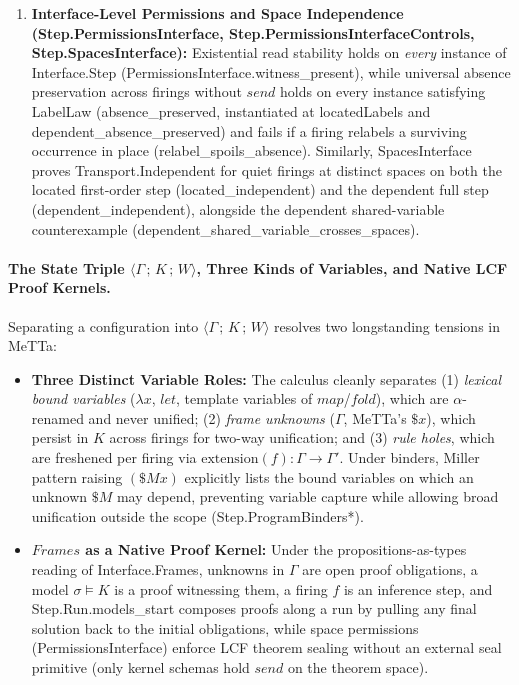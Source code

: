 \documentclass[11pt,a4paper]{article}
\theoremstyle{definition}
\DeclareRobustCommand{\lean}[1]{%
  \ifmmode\text{\normalfont\ttfamily\footnotesize\detokenize{#1}}%
  \else{\normalfont\footnotesize\leanurl{#1}}\fi}
\DeclareRobustCommand{\metta}[1]{\text{\normalfont\ttfamily\footnotesize #1}}
\def\lean#1{#1}%
\def\metta#1{#1}%
\begin{document}
\begin{enumerate}[leftmargin=2em, nosep]
  \item \textbf{Interface-Level Permissions and Space Independence (\lean{Step.PermissionsInterface}, \lean{Step.PermissionsInterfaceControls}, \lean{Step.SpacesInterface}):}
  Existential read stability holds on \emph{every} instance of \lean{Interface.Step} (\lean{PermissionsInterface.witness_present}), while universal absence preservation across firings without $\lean{send}$ holds on every instance satisfying \lean{LabelLaw} (\lean{absence_preserved}, instantiated at \lean{locatedLabels} and \lean{dependent_absence_preserved}) and fails if a firing relabels a surviving occurrence in place (\lean{relabel_spoils_absence}). Similarly, \lean{SpacesInterface} proves \lean{Transport.Independent} for quiet firings at distinct spaces on both the located first-order step (\lean{located_independent}) and the dependent full step (\lean{dependent_independent}), alongside the dependent shared-variable counterexample (\lean{dependent_shared_variable_crosses_spaces}).
\end{enumerate}

\paragraph{The State Triple $\langle \Gamma \,;\, K \,;\, W \rangle$, Three Kinds of Variables, and Native LCF Proof Kernels.}
Separating a configuration into $\langle \Gamma \,;\, K \,;\, W \rangle$ resolves two longstanding tensions in MeTTa:
\begin{itemize}[leftmargin=1.8em, nosep]
  \item \textbf{Three Distinct Variable Roles:} The calculus cleanly separates (1) \emph{lexical bound variables} ($\lambda x$, $\metta{let}$, template variables of $\metta{map}$/$\metta{fold}$), which are $\alpha$-renamed and never unified; (2) \emph{frame unknowns} ($\Gamma$, MeTTa's $\$x$), which persist in $K$ across firings for two-way unification; and (3) \emph{rule holes}, which are freshened per firing via $\mathrm{extension}(f) : \Gamma \to \Gamma'$. Under binders, Miller pattern raising $\metta{(\$M }x\metta{)}$ explicitly lists the bound variables on which an unknown $\$M$ may depend, preventing variable capture while allowing broad unification outside the scope (\lean{Step.ProgramBinders*}).
  \item \textbf{$\lean{Frames}$ as a Native Proof Kernel:} Under the propositions-as-types reading of \lean{Interface.Frames}, unknowns in $\Gamma$ are open proof obligations, a model $\sigma \models K$ is a proof witnessing them, a firing $f$ is an inference step, and \lean{Step.Run.models_start} composes proofs along a run by pulling any final solution back to the initial obligations, while space permissions (\lean{PermissionsInterface}) enforce LCF theorem sealing without an external seal primitive (only kernel schemas hold $\lean{send}$ on the theorem space).
\end{itemize}
\end{document}
